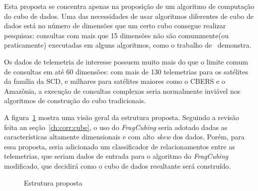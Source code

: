 {\color{cerulean}
Esta proposta se concentra apenas na proposição de um algoritmo de computação do cubo de dados.
Uma das necessidades de usar algoritmos diferentes de cubo de dados está no número de dimensões que um certo cubo consegue realizar pesquisas: consultas com mais que 15 dimensões não são comummente(ou praticamente) executadas em alguns algoritmos, como o trabalho de~ demonstra.

Os dados de telemetria de interesse possuem muito mais do que o limite comum de consultas em até 60 dimensões: com mais de 130 telemetrias para os satélites da família da SCD, e milhares para satélites maiores como o CBERS e o Amazônia, a execução de consultas complexas seria normalmente inviável nos algoritmos de construção do cubo tradicionais.

A figura~\ref{fig:qualistructure} mostra uma visão geral da estrutura proposta.
Seguindo a revisão feita an seção~\ref{ch:corr:cube}, o uso do \textit{FragCubing} seria adotado dadas as características altamente dimensionais e com alto \textit{skew} dos dados.
Porém, para essa proposta, seria adicionado um classificador de relacionamentos entre as telemetrias, que seriam dados de entrada para o algoritmo do \textit{FragCubing} modificado, que decidirá como o cubo de dados resultante será construído.

\begin{figure}[!htb]
	\caption{Estrutura proposta}\label{fig:qualistructure}
	\vspace{2mm}
	\begin{center}
	\end{center}
	\vspace{1mm}
	\legenda{}
\end{figure}

}
